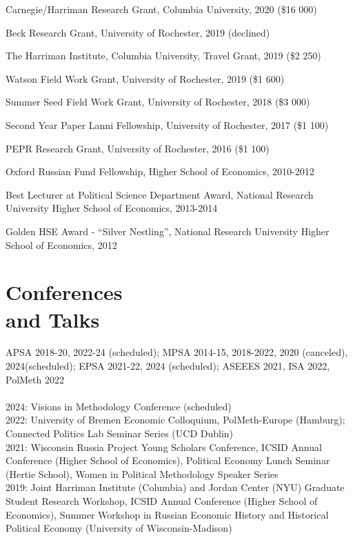 \documentclass[margin,line,10.95pt]{res}
\begin{document}
\begin{resume}
Carnegie/Harriman Research Grant, Columbia University, 2020 (\$16 000)
\vspace*{-4.5mm}

Beck Research Grant, University of Rochester, 2019 (declined)
\vspace*{-4.5mm}

The Harriman Institute, Columbia University, Travel Grant, 2019 (\$2 250)
\vspace*{-4.5mm}

Watson Field Work Grant, University of Rochester, 2019 (\$1 600)
\vspace*{-4.5mm}

Summer Seed Field Work Grant, University of Rochester, 2018 (\$3 000)
\vspace*{-4.5mm}

Second Year Paper Lanni Fellowship, University of Rochester, 2017 (\$1 100)
\vspace*{-4.5mm}

PEPR Research Grant, University of Rochester, 2016 (\$1 100)
\vspace*{-4.5mm}


Oxford Russian Fund Fellowship, Higher School of Economics, 2010-2012 
\vspace*{-2.5mm}

Best Lecturer at Political Science Department Award, National Research University Higher School of Economics, 2013-2014 
\vspace*{-4.5mm}

Golden HSE Award - ``Silver Nestling'', National Research University Higher School of Economics, 2012
\vspace*{-2.5mm}


\section{\sc Conferences \\ and Talks}

APSA 2018-20, 2022-24 (scheduled); MPSA 2014-15, 2018-2022, 2020 (canceled), 2024(scheduled); EPSA 2021-22, 2024 (scheduled); ASEEES 2021, ISA 2022, PolMeth 2022
\\
\\
2024: Visions in Methodology Conference (scheduled)\\
2022: University of Bremen Economic Colloquium, PolMeth-Europe (Hamburg); Connected Politics Lab Seminar Series (UCD Dublin)
\\
2021: Wisconsin Russia Project Young Scholars Conference, ICSID Annual Conference (Higher School of Economics), Political Economy Lunch Seminar (Hertie School), Women in Political Methodology Speaker Series
\\
2019: Joint Harriman Institute (Columbia) and Jordan Center (NYU) Graduate Student Research Workshop,  ICSID Annual Conference (Higher School of Economics), Summer Workshop in Russian Economic History and Historical Political Economy (University of Wisconsin-Madison) 



\end{resume}
\end{document}
